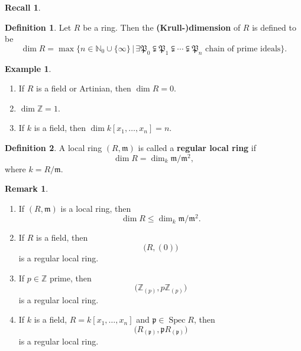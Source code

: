 \documentclass[12pt]{article}
\DeclareMathOperator{\Spec}{Spec}
\theoremstyle{definition}
\newtheorem*{definition}{Definition}
\newtheorem*{remark}{Remark}
\newtheorem*{recall}{Recall}
\newtheorem*{example}{Example}
\begin{document}
\begin{recall}
\begin{definition}
Let $R$ be a ring. Then the \textbf{(Krull-)dimension} of $R$ is defined to be
\[\dim R=\max\{n\in\mathbb{N}_0\cup\{\infty\}\,|\,\exists\mathfrak{P}_0\subsetneqq\mathfrak{P}_1\subsetneqq\cdots\subsetneqq\mathfrak{P}_n\text{ chain of prime ideals}\}.\]
\end{definition}

\begin{example}
\begin{enumerate}[label=\arabic*)]
\item If $R$ is a field or Artinian, then $\dim R=0$.

\item $\dim\mathbb{Z}=1$.

\item If $k$ is a field, then $\dim k[x_1,\ldots,x_n]=n$.
\end{enumerate}
\end{example}
\end{recall}

\begin{definition}
A local ring $(R,\mathfrak{m})$ is called a \textbf{regular local ring} if
\[\dim R=\dim_k\mathfrak{m}/\mathfrak{m}^2,\]
where $k=R/\mathfrak{m}$.
\end{definition}

\begin{remark}
\begin{enumerate}[label=\arabic*)]
\item If $(R,\mathfrak{m})$ is a local ring, then
\[\dim R\leq\dim_k\mathfrak{m}/\mathfrak{m}^2.\]

\item If $R$ is a field, then
\[\big(R,(0)\big)\]
is a regular local ring.

\item If $p\in\mathbb{Z}$ prime, then
\[\big(\mathbb{Z}_{(p)},p\mathbb{Z}_{(p)}\big)\]
is a regular local ring.

\item If $k$ is a field, $R=k[x_1,\ldots,x_n]$ and $\mathfrak{p}\in\Spec R$, then
\[\big(R_{(\mathfrak{p})},\mathfrak{p}R_{(\mathfrak{p})}\big)\]
is a regular local ring.
\end{enumerate}
\end{remark}
\end{document}
